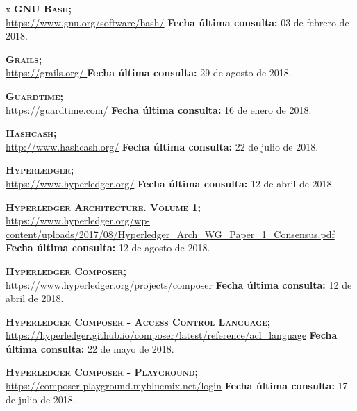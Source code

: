 \begin{thebibliography} {x}
	 \textsc{\textbf{GNU Bash; }} \\ 
	\url{https://www.gnu.org/software/bash/}
	\newline \textbf{Fecha última consulta:} 03 de febrero de 2018.
		
	 \textsc{\textbf{Grails; }} \\ 
	\url{https://grails.org/	}
	\newline \textbf{Fecha última consulta:} 29 de agosto de 2018.
	
	 \textsc{\textbf{Guardtime; }} \\ 
	\url{https://guardtime.com/}
	\newline \textbf{Fecha última consulta:} 16 de enero de 2018.
		
	 \textsc{\textbf{Hashcash; }} \\ 
	\url{http://www.hashcash.org/} 
	\newline \textbf{Fecha última consulta:} 22 de julio de 2018.
	
	 \textsc{\textbf{Hyperledger; }} \\ 
	\url{https://www.hyperledger.org/} 
	\newline \textbf{Fecha última consulta:} 12 de abril de 2018.

	 \textsc{\textbf{Hyperledger Architecture. Volume 1; }} \\ 
	\url{https://www.hyperledger.org/wp-content/uploads/2017/08/Hyperledger_Arch_WG_Paper_1_Consensus.pdf} 
	\newline \textbf{Fecha última consulta:} 12 de agosto de 2018.
	
	 \textsc{\textbf{Hyperledger Composer; }} \\ 
	\url{https://www.hyperledger.org/projects/composer} 
	\newline \textbf{Fecha última consulta:} 12 de abril de 2018.
	
	 \textsc{\textbf{Hyperledger Composer - Access Control Language; }} \\ 
	\url{https://hyperledger.github.io/composer/latest/reference/acl_language} 
	\newline \textbf{Fecha última consulta:} 22 de mayo de 2018.
		
	 \textsc{\textbf{Hyperledger Composer - Playground; }} \\ 
	\url{https://composer-playground.mybluemix.net/login} 
	\newline \textbf{Fecha última consulta:} 17 de julio de 2018.
	

\end{thebibliography}
